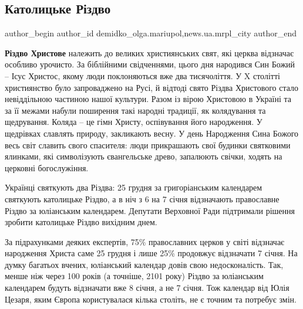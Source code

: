  
 
 
 
 
 
\subsection{Католицьке Різдво}
\label{sec:24_12_2017.stz.news.ua.mrpl_city.1.katolycke_rizdvo}
 
\ifcmt
 author_begin
   author_id demidko_olga.mariupol,news.ua.mrpl_city
 author_end
\fi

\textbf{Різдво Христове} належить до великих християнських свят, які церква
відзначає особливо урочисто. За біблійними свідченнями, цього дня народився Син
Божий – Ісус Христос, якому люди поклоняються вже два тисячоліття. У X столітті
християнство було запроваджено на Русі, й відтоді свято Різдва Христового стало
невіддільною частиною нашої культури. Разом із вірою Христовою в Україні та за
її межами набули поширення такі народні традиції, як колядування та щедрування.
Коляда – це гімн Христу, оспівування його народження. У щедрівках славлять
природу, закликають весну. У день Народження Сина Божого весь світ славить
свого спасителя: люди прикрашають свої будинки святковими ялинками, які
символізують євангельське древо, запалюють свічки, ходять на церковні
богослужіння.

Українці святкують два Різдва: 25 грудня за григоріанським календарем святкують
католицьке Різдво, а в ніч з 6 на 7 січня відзначають православне Різдво за
юліанським календарем. Депутати Верховної Ради підтримали рішення зробити
католицьке Різдво вихідним днем.

За підрахунками деяких експертів, 75\% православних церков у світі відзначає
народження Христа саме 25 грудня і лише 25\% продовжує відзначати 7 січня. На
думку багатьох вчених, юліанський календар довів свою недосконалість. Так,
менше ніж через 100 років (а точніше, 2101 року) Різдво за юліанським
календарем будуть відзначати вже 8 січня, а не 7 січня. Тож календар від Юлія
Цезаря, яким Європа користувалася кілька століть, не є точним та потребує змін.


